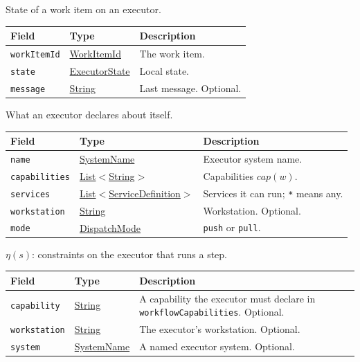 \documentclass[a4paper]{arrowhead}
\newcommand{\mref}[1]{{\textcolor{ArrowheadPurple}{\hyperref[sec:model:#1]{#1}}}}
\newcommand{\pref}[1]{{\textcolor{ArrowheadGrey}{\hyperref[sec:model:primitives:#1]{#1}}}}
\begin{document}
State of a work item on an executor.

{\small
\begin{longtable}{|p{3.9cm}|p{4.4cm}|p{7.5cm}|}

\hline
\rowcolor{gray!33} Field & Type & Description \\ \hline
\endhead
\texttt{workItemId} & \pref{WorkItemId} & The work item. \\ \hline
\texttt{state} & \mref{ExecutorState} & Local state. \\ \hline
\texttt{message} & \pref{String} & Last message. Optional. \\ \hline
\end{longtable}
}

What an executor declares about itself.

{\small
\begin{longtable}{|p{3.9cm}|p{4.4cm}|p{7.5cm}|}

\hline
\rowcolor{gray!33} Field & Type & Description \\ \hline
\endhead
\texttt{name} & \pref{SystemName} & Executor system name. \\ \hline
\texttt{capabilities} & \pref{List}$<$\pref{String}$>$ & Capabilities $cap(w)$. \\ \hline
\texttt{services} & \pref{List}$<$\pref{ServiceDefinition}$>$ & Services it can run; \texttt{*} means any. \\ \hline
\texttt{workstation} & \pref{String} & Workstation. Optional. \\ \hline
\texttt{mode} & \mref{DispatchMode} & \texttt{push} or \texttt{pull}. \\ \hline
\end{longtable}
}

$\eta(s)$: constraints on the executor that runs a step.

{\small
\begin{longtable}{|p{3.9cm}|p{4.4cm}|p{7.5cm}|}

\hline
\rowcolor{gray!33} Field & Type & Description \\ \hline
\endhead
\texttt{capability} & \pref{String} & A capability the executor must declare in \texttt{workflowCapabilities}. Optional. \\ \hline
\texttt{workstation} & \pref{String} & The executor's workstation. Optional. \\ \hline
\texttt{system} & \pref{SystemName} & A named executor system. Optional. \\ \hline
\end{longtable}
}
\end{document}
